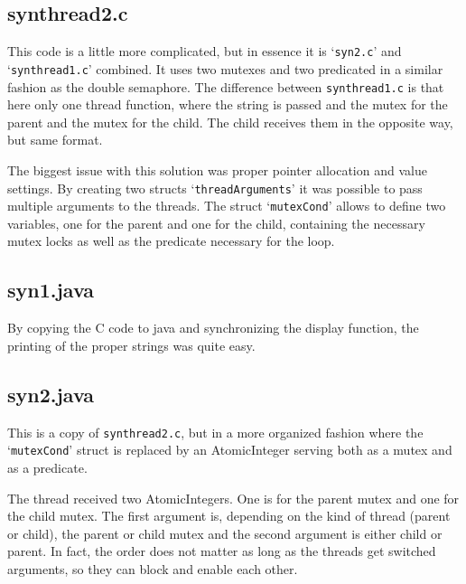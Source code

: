 \documentclass[11pt]{article}
\begin{document}
\subsection{synthread2.c}
This code is a little more complicated, but in essence it is `\texttt{syn2.c}' and `\texttt{synthread1.c}' combined. It uses two mutexes and two predicated in a similar fashion as the double semaphore. The difference between \texttt{synthread1.c} is that here only one thread function, where the string is passed and the mutex for the parent and the mutex for the child. The child receives them in the opposite way, but same format.

The biggest issue with this solution was proper pointer allocation and value settings. By creating two structs `\texttt{threadArguments}' it was possible to pass multiple arguments to the threads. The struct `\texttt{mutexCond}' allows to define two variables, one for the parent and one for the child, containing the necessary mutex locks as well as the predicate necessary for the loop.

\subsection{syn1.java}
By copying the C code to java and synchronizing the display function, the printing of the proper strings was quite easy.

\subsection{syn2.java}
This is a copy of \texttt{synthread2.c}, but in a more organized fashion where the `\texttt{mutexCond}' struct is replaced by an AtomicInteger serving both as a mutex and as a predicate.

The thread received two AtomicIntegers. One is for the parent mutex and one for the child mutex. The first argument is, depending on the kind of thread (parent or child), the parent or child mutex and the second argument is either child or parent. In fact, the order does not matter as long as the threads get switched arguments, so they can block and enable each other.
\end{document}
